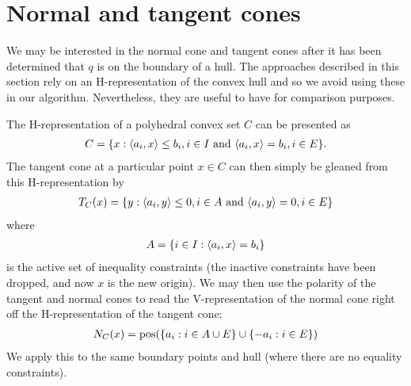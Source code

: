 
\section{Normal and tangent cones}
We may be interested in the normal cone and tangent cones after it has been
determined that $q$ is on the boundary of a  hull.  The approaches described
in this section rely on an H-representation of the convex hull and so we avoid 
using these in our algorithm.  Nevertheless, they are useful to have for
comparison purposes.

The H-representation of a polyhedral convex set $C$ can be presented as
\begin{align*}
	C = \{ x: \langle a_i, x \rangle \leq b_i, i \in I \text{ and } 
				\langle a_i, x \rangle = b_i, i \in E \}.
\end{align*}
The tangent cone at a particular point $x \in C$ can then simply be gleaned from 
this H-representation by
\begin{align*}
	T_C(x) = \{ y: \langle a_i, y \rangle \leq 0, i \in A \text{ and } 
				\langle a_i, y \rangle = 0, i \in E \}
\end{align*}
where 
\begin{align*}
	A = \{ i \in I: \langle a_i, x \rangle = b_i \}
\end{align*}
is the active set of inequality constraints (the inactive constraints have been
 dropped, and now $x$ is the new origin).
We may then use the polarity of the tangent and normal cones to read the 
V-representation of the normal cone right off the H-representation 
of the tangent cone:
\begin{align*}
	N_C(x) = \operatorname{pos}( \{ a_i: i \in A \cup E \} \cup \{ -a_i: i \in E \} )
\end{align*}
We apply this to the same boundary points and hull (where there are no 
equality constraints).
